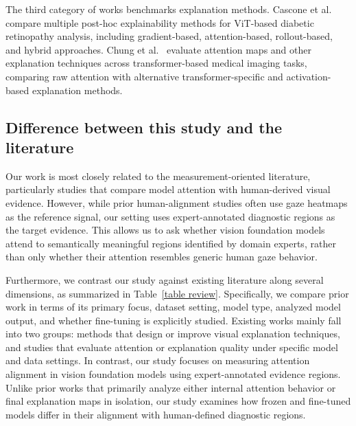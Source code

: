 \documentclass[lineno,pdflatex,sn-mathphys-num]{sn-jnl}%
\theoremstyle{thmstyleone}%
\theoremstyle{thmstyletwo}%
\theoremstyle{thmstylethree}%
\begin{document}
The third category of works benchmarks explanation methods. Cascone et al.~\cite{Cascone2026947} compare multiple post-hoc explainability methods for ViT-based diabetic retinopathy analysis, including gradient-based, attention-based, rollout-based, and hybrid approaches. Chung et al.~\cite{Chung2025110} evaluate attention maps and other explanation techniques across transformer-based medical imaging tasks, comparing raw attention with alternative transformer-specific and activation-based explanation methods.

\subsection{Difference between this study and the literature}

Our work is most closely related to the measurement-oriented literature, particularly studies that compare model attention with human-derived visual evidence. However, while prior human-alignment studies often use gaze heatmaps as the reference signal, our setting uses expert-annotated diagnostic regions as the target evidence. This allows us to ask whether vision foundation models attend to semantically meaningful regions identified by domain experts, rather than only whether their attention resembles generic human gaze behavior.

Furthermore, we contrast our study against existing literature along several dimensions, as summarized in Table~\ref{table review}. Specifically, we compare prior work in terms of its primary focus, dataset setting, model type, analyzed model output, and whether fine-tuning is explicitly studied. Existing works mainly fall into two groups: methods that design or improve visual explanation techniques, and studies that evaluate attention or explanation quality under specific model and data settings. In contrast, our study focuses on measuring attention alignment in vision foundation models using expert-annotated evidence regions. Unlike prior works that primarily analyze either internal attention behavior or final explanation maps in isolation, our study examines how frozen and fine-tuned models differ in their alignment with human-defined diagnostic regions.
\end{document}
